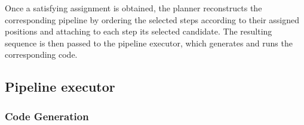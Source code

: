 \documentclass[runningheads]{llncs}
\newcommand{\sidenote}[3]{\todo[linecolor=#1,backgroundcolor=#1!25,bordercolor=#1,size=\tiny]{\textbf{#2:} #3}}
\newcommand{\malasidenote}[1]{\sidenote{violet}{Mattia}{#1}}
\begin{document}
Once a satisfying assignment is obtained,
the planner reconstructs the corresponding pipeline by ordering the selected steps according to their assigned positions
and attaching to each step its selected candidate.
%
The resulting sequence is then passed to the pipeline executor,
which generates and runs the corresponding code.





\subsection{Pipeline executor}
\label{subsec:pipeline-execution}

\subsubsection{Code Generation}
\end{document}
